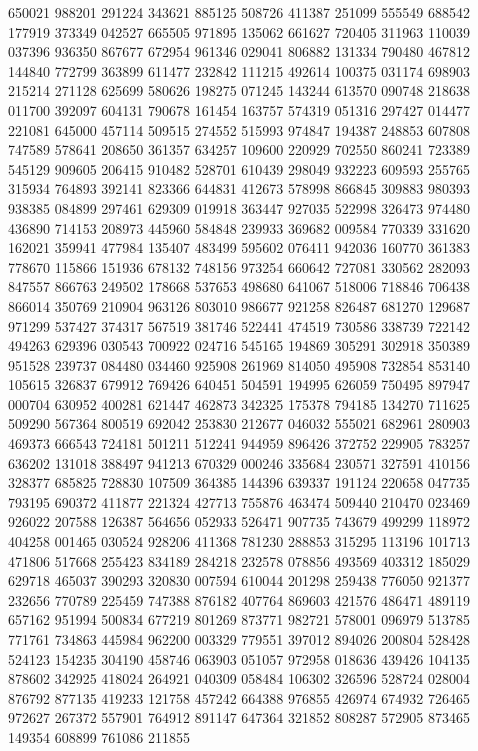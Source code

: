 {650021 988201 291224 343621 885125 508726 411387 251099 555549 688542 177919%
373349 042527 665505 971895 135062 661627 720405 311963 110039 037396 936350%
867677 672954 961346 029041 806882 131334 790480 467812 144840 772799 363899%
611477 232842 111215 492614 100375 031174 698903 215214 271128 625699 580626%
198275 071245 143244 613570 090748 218638 011700 392097 604131 790678 161454%
163757 574319 051316 297427 014477 221081 645000 457114 509515 274552 515993%
974847 194387 248853 607808 747589 578641 208650 361357 634257 109600 220929%
702550 860241 723389 545129 909605 206415 910482 528701 610439 298049 932223%
609593 255765 315934 764893 392141 823366 644831 412673 578998 866845 309883%
980393 938385 084899 297461 629309 019918 363447 927035 522998 326473 974480%
436890 714153 208973 445960 584848 239933 369682 009584 770339 331620 162021%
359941 477984 135407 483499 595602 076411 942036 160770 361383 778670 115866%
151936 678132 748156 973254 660642 727081 330562 282093 847557 866763 249502%
178668 537653 498680 641067 518006 718846 706438 866014 350769 210904 963126%
803010 986677 921258 826487 681270 129687 971299 537427 374317 567519 381746%
522441 474519 730586 338739 722142 494263 629396 030543 700922 024716 545165%
194869 305291 302918 350389 951528 239737 084480 034460 925908 261969 814050%
495908 732854 853140 105615 326837 679912 769426 640451 504591 194995 626059%
750495 897947 000704 630952 400281 621447 462873 342325 175378 794185 134270%
711625 509290 567364 800519 692042 253830 212677 046032 555021 682961 280903%
469373 666543 724181 501211 512241 944959 896426 372752 229905 783257 636202%
131018 388497 941213 670329 000246 335684 230571 327591 410156 328377 685825%
728830 107509 364385 144396 639337 191124 220658 047735 793195 690372 411877%
221324 427713 755876 463474 509440 210470 023469 926022 207588 126387 564656%
052933 526471 907735 743679 499299 118972 404258 001465 030524 928206 411368%
781230 288853 315295 113196 101713 471806 517668 255423 834189 284218 232578%
078856 493569 403312 185029 629718 465037 390293 320830 007594 610044 201298%
259438 776050 921377 232656 770789 225459 747388 876182 407764 869603 421576%
486471 489119 657162 951994 500834 677219 801269 873771 982721 578001 096979%
513785 771761 734863 445984 962200 003329 779551 397012 894026 200804 528428%
524123 154235 304190 458746 063903 051057 972958 018636 439426 104135 878602%
342925 418024 264921 040309 058484 106302 326596 528724 028004 876792 877135%
419233 121758 457242 664388 976855 426974 674932 726465 972627 267372 557901%
764912 891147 647364 321852 808287 572905 873465 149354 608899 761086 211855%
}
